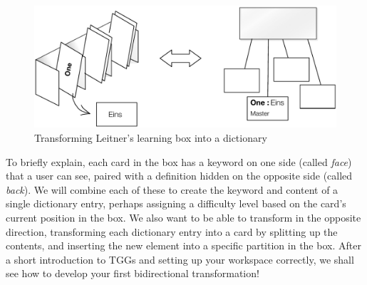 \begin{figure}[htbp]
\begin{center}
  \includegraphics[width=\textwidth]{../../org.moflon.doc.handbook.04_tripleGraphTransformations/src/TGGTransformationExample.pdf}
  \caption{Transforming Leitner's learning box into a dictionary}
  \label{fig:transformIdea}
\end{center}
\end{figure}

To briefly explain, each card in the box has a keyword on one side (called \emph{face}) that a user can see, paired with a definition hidden on the opposite side (called \emph{back}). 
We will combine each of these to create the keyword and content of a single dictionary entry, perhaps assigning a difficulty level based on the card's current position in the box. 
We also want to be able to transform in the opposite direction, transforming each dictionary entry into a card by splitting up the contents, and inserting the new element into a specific partition in the box. 
After a short introduction to TGGs and setting up your workspace correctly, we shall see how to develop
your first bidirectional transformation!
